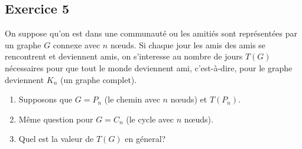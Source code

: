 \subsection*{Exercice 5}
On suppose qu'on est dans une communaut\'{e} ou les amiti\'{e}s sont repr\'{e}sent\'{e}es par un graphe $G$ connexe avec $n$ n\oe{}uds. 
Si chaque jour les amis des amis se rencontrent et deviennent amis, on s'interesse au nombre de jours $T(G)$ n\'{e}cessaires
pour que tout le monde deviennent ami, c'est-\`{a}-dire, pour le graphe deviennent $K_n$ (un graphe complet).
\begin{enumerate}
\item Supposons que $G = P_n$ (le chemin avec $n$ n\oe{}uds) et $T(P_n)$.
\item M\^{e}me question pour $G = C_n$ (le cycle avec $n$ n\oe{}uds).
\item Quel est la valeur de $T(G)$ en g\'{e}neral?
\end{enumerate}

